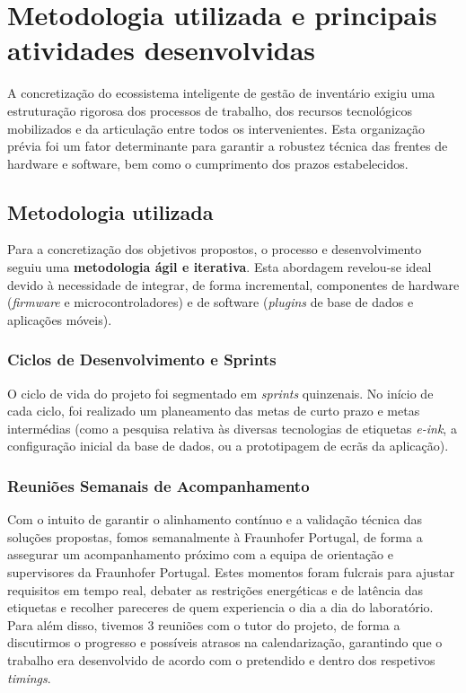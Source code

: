 \documentclass[10pt]{article}
\begin{document}
\section{Metodologia utilizada e principais atividades desenvolvidas}

A concretização do ecossistema inteligente de gestão de inventário exigiu uma estruturação rigorosa dos processos de trabalho, dos recursos tecnológicos mobilizados e da articulação entre todos os intervenientes. Esta organização prévia foi um fator determinante para garantir a robustez técnica das frentes de hardware e software, bem como o cumprimento dos prazos estabelecidos.

\subsection{Metodologia utilizada}

Para a concretização dos objetivos propostos, o processo e desenvolvimento seguiu uma \textbf{metodologia ágil e iterativa}. Esta abordagem revelou-se ideal devido à necessidade de integrar, de forma incremental, componentes de hardware (\textit{firmware} e microcontroladores) e de software (\textit{plugins} de base de dados e aplicações móveis).

\subsubsection*{Ciclos de Desenvolvimento e Sprints}
O ciclo de vida do projeto foi segmentado em \textit{sprints} quinzenais. No início de cada ciclo, foi realizado um planeamento das metas de curto prazo e metas intermédias (como a pesquisa relativa às diversas tecnologias de etiquetas \textit{e-ink}, a configuração inicial da base de dados, ou a prototipagem de ecrãs da aplicação).

\subsubsection*{Reuniões Semanais de Acompanhamento}
Com o intuito de garantir o alinhamento contínuo e a validação técnica das soluções propostas, fomos semanalmente à Fraunhofer Portugal, de forma a assegurar um acompanhamento próximo com a equipa de orientação e supervisores da Fraunhofer Portugal. Estes momentos foram fulcrais para ajustar requisitos em tempo real, debater as restrições energéticas e de latência das etiquetas e recolher pareceres de quem experiencia o dia a dia do laboratório.
Para além disso, tivemos 3 reuniões com o tutor do projeto, de forma a discutirmos o progresso e possíveis atrasos na calendarização, garantindo que o trabalho era desenvolvido de acordo com o pretendido e dentro dos respetivos \textit{timings}.
\end{document}

